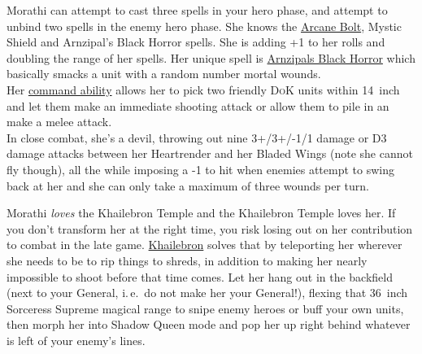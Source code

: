 Morathi can attempt to cast three spells in your hero phase, and attempt to
 unbind two spells in the enemy hero
phase. She knows the \hyperref[arcane-bolt]{Arcane Bolt}, Mystic Shield and
Arnzipal's Black Horror spells.  She is adding +1 to her rolls and doubling the
range of her spells.  Her unique spell is
\hyperref[spell:arnzipals-black-horror]{Arnzipals Black Horror} which basically
smacks a unit with a random number mortal wounds.\\ Her 
\hyperref[worship-through-bloodshed]{command ability} allows her to pick two friendly
\textsc{DoK} units within 14~inch and let them make an immediate shooting
attack or allow them to pile in an make a melee attack.\\  In close combat, she's a devil, throwing out nine
3+/3+/-1/1 damage or D3 damage attacks between her Heartrender and her Bladed
Wings (note she cannot fly though), all the while imposing a -1 to hit when
enemies attempt to swing back at her and she can only take a maximum of three
wounds per turn. 

Morathi \emph{loves} the Khailebron Temple and the Khailebron Temple loves her.
If you don't transform her at the right time, you risk losing out on her
contribution to combat in the late game.
\hyperref[temple:khailebron]{Khailebron} solves that by teleporting her
wherever she needs to be to rip things to shreds, in addition to making her
nearly impossible to shoot before that time comes. Let her hang out in the
backfield (next to your General, i.\,e.\, do not make her your General!),
flexing that 36~inch Sorceress Supreme magical range to snipe enemy heroes or
buff your own units, then morph her into Shadow Queen mode and pop her up right
behind whatever is left of your enemy's lines.\\


